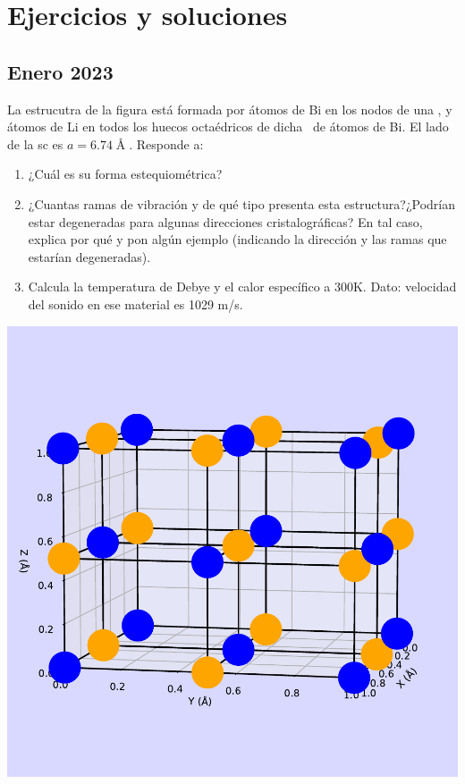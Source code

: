 \chapter{Ejercicios y soluciones}




\section*{Enero 2023}
\setcounter{section}{1} %


\begin{ejercicio}
	La estrucutra de la figura está formada por átomos de Bi en los nodos de una \fcc, y átomos de Li en todos los huecos octaédricos de dicha \fcc \ de átomos de Bi. El lado de la sc es $a=6.74 \unit{\Angstrom}$. Responde a:
	\begin{enumerate}[label=\alph*)]
		\item ¿Cuál es su forma estequiométrica?
		\item ¿Cuantas ramas de vibración y de qué tipo presenta esta estructura?¿Podrían estar degeneradas para algunas direcciones cristalográficas? En tal caso, explica por qué y pon algún ejemplo (indicando la dirección y las ramas que estarían degeneradas).
		\item Calcula la temperatura de Debye y el calor específico a 300K. Dato: velocidad del sonido en ese material es 1029 m/s. 
	\end{enumerate}
	\begin{center}
		\includegraphics[scale=0.5]{Imagenes/2023-Enero-01.pdf}
	\end{center}
		
\end{ejercicio}	

